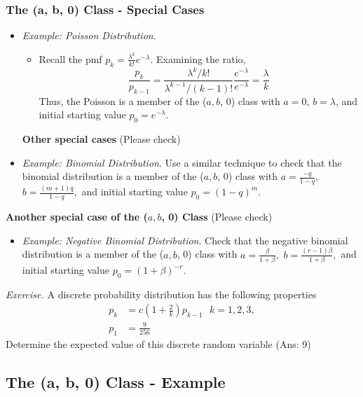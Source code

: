 \documentclass[]{book}
\providecommand{\tightlist}{%
  \setlength{\itemsep}{0pt}\setlength{\parskip}{0pt}}
\theoremstyle{definition}
\theoremstyle{definition}
\theoremstyle{definition}
\theoremstyle{remark}
\begin{document}
\subsubsection{The (a, b, 0) Class - Special
Cases}\label{the-a-b-0-class---special-cases}

\begin{itemize}
\item
  \emph{Example: Poisson Distribution}.

  \begin{itemize}
  \tightlist
  \item
    Recall the pmf \(p_k =\frac{\lambda^k}{k!}e^{-\lambda}\). Examining
    the ratio,
    \[\frac{p_k}{p_{k-1}} = \frac{\lambda^k/k!}{\lambda^{k-1}/(k-1)!}\frac{e^{-\lambda}}{e^{-\lambda}}= \frac{\lambda}{k}\]
    Thus, the Poisson is a member of the (\(a, b\), 0) class with
    \(a = 0\), \(b = \lambda\), and initial starting value
    \(p_0 = e^{-\lambda}\).
  \end{itemize}

  \textbf{Other special cases} (Please check)
\item
  \emph{Example: Binomial Distribution}. Use a similar technique to
  check that the binomial distribution is a member of the (\(a, b\), 0)
  class with \(a = \frac{-q}{1-q},\) \(b = \frac{(m+1)q}{1-q},\) and
  initial starting value \(p_0 = (1-q)^m\).
\end{itemize}

\textbf{Another special case of the (\(a, b\), 0) Class} (Please check)

\begin{itemize}
\tightlist
\item
  \emph{Example: Negative Binomial Distribution}. Check that the
  negative binomial distribution is a member of the (\(a, b\), 0) class
  with \(a = \frac{\beta}{1+\beta},\)
  \(b = \frac{(r-1)\beta}{1+\beta},\) and initial starting value
  \(p_0 = (1+\beta)^{-r}\).
\end{itemize}

\emph{Exercise.} A discrete probability distribution has the following
properties \[\begin{aligned}
p_k&=c\left( 1+\frac{2}{k}\right) p_{k-1} \:\:\: k=1,2,3,\\
p_1&= \frac{9}{256}\end{aligned}\] Determine the expected value of this
discrete random variable (Ans: 9)

\subsection{The (a, b, 0) Class -
Example}\label{the-a-b-0-class---example}
\end{document}
